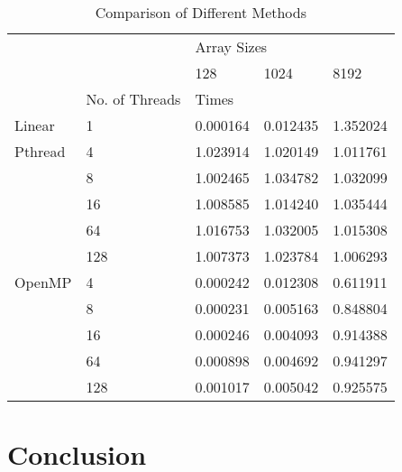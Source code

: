\documentclass[journal, a4paper]{IEEEtran}
\begin{document}
\begin{table}[H]
\centering
\caption{Comparison of Different Methods}
\label{my-label}
\begin{tabular}{|l|l|l|l|l|}
\hline
\multicolumn{2}{|l|}{\multirow{2}{*}{}} & \multicolumn{3}{l|}{Array Sizes} \\ \cline{3-5} 
\multicolumn{2}{|l|}{}                  & 128      & 1024      & 8192      \\ \hline
                     & No. of Threads   & \multicolumn{3}{l|}{Times}       \\ \hline
Linear               & 1                &     0.000164     &       0.012435    &       1.352024    \\ \hline
Pthread              & 4                &    1.023914      &      1.020149     &    1.011761      \\ \hline
\multirow{4}{*}{}    & 8                &   1.002465     &    1.034782       &  1.032099         \\ \cline{2-5} 
                     & 16               &   1.008585      &      1.014240     &    1.035444       \\ \cline{2-5} 
                     & 64               &    1.016753     &    1.032005       &     1.015308      \\ \cline{2-5} 
                     & 128              &   1.007373       &   1.023784        &   1.006293         \\ \hline
OpenMP               & 4                &  0.000242        &      0.012308     &     0.611911      \\ \hline
\multirow{4}{*}{}    & 8                &   0.000231       &    0.005163       &   0.848804        \\ \cline{2-5} 
                     & 16               &  0.000246          &    0.004093       &    0.914388       \\ \cline{2-5} 
                     & 64               &     0.000898     &     0.004692      &     0.941297      \\ \cline{2-5} 
                     & 128              &   0.001017       &    0.005042       &     0.925575      \\ \hline
\end{tabular}
\end{table}

\section{Conclusion}
	
\end{document}

